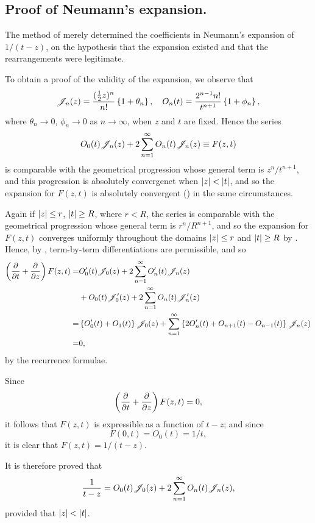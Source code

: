 \documentclass{book}
\begin{document}
\subsection{Proof of Neumann's expansion.}
The method of  merely determined the
coefficients in Neumann's expansion of $1/(t-z)$, on the hypothesis
that the expansion existed and that the rearrangements were
legitimate.

To obtain a proof of the validity of the expansion, we observe that
$$
\mathscr{J}_n(z)
=
\frac{(\frac{1}{2} z)^n}{n!} 
\left\{ 1 + \theta_n \right\},
\quad
O_n(t)
=
\frac{2^{n-1} n!}{t^{n+1}}
\left\{  1 + \phi_n \right\},
$$
%
%
where $\theta_n \rightarrow 0$, $\phi_n \rightarrow 0$ as $n
\rightarrow \infty$, when $z$ and $t$ are fixed. Hence the series
$$
O_0(t) \mathscr{J}_n(z)
+
2
\sum_{n=1}^{\infty}
O_n(t) \mathscr{J}_n(z)
\equiv
F(z,t)
$$
is comparable with the geometrical progression whose general term is
$z^n / t^{n+1}$, and this progression is absolutely convergenet when
$\left| z \right| < \left| t \right|$, and so the expansion for $F(z,t)$ is
absolutely convergent () in the same
circumstances.

Again if $\left| z \right| \leq r$, $\left| t \right| \geq R$, where $r < R$, the
series is comparable with the geometrical progression whose general
term is $r^n / R^{n+1}$, and so the expansion for $F(z,t)$ converges
uniformly throughout the domains $\left| z \right| \leq r$ and $\left| t \right|
\geq R$ by . Hence, by
, term-by-term differentiations are permissible,
and so
\begin{align*}
  \left(  \frac{\partial}{\partial t} + \frac{\partial}{\partial z}
   \right)
  F(z,t)
  =&
  O_0'(t) \mathscr{J}_0(z)
  + 2 \sum_{n=1}^{\infty} O_n'(t) \mathscr{J}_n(z)
  \\
  &
  + O_0(t) \mathscr{J}'_0(z)
  + 2 \sum_{n=1}^{\infty}
  O_n(t) \mathscr{J}'_n(z)
  \\
  =&
  \left\{  O_0'(t) + O_1(t) \right\} \mathscr{J}_0(z)
  + \sum_{n=1}^{\infty} \left\{ 
    2 O_n'(t) + O_{n+1}(t) - O_{n-1}(t)
   \right\}
  \mathscr{J}_n(z)
  \\
  =&
  0,
\end{align*}
by the recurrence formulae.

Since
$$
\left(  \frac{\partial}{\partial t} + \frac{\partial}{\partial z}
 \right)
F(z,t)
=
0,
$$
it follows that $F(z,t)$ is expressible as a function of $t-z$; and
since
$$
F(0,t) = O_0(t) = 1/t,
$$
it is clear that $F(z,t) = 1/(t-z)$.

It is therefore proved that
$$
\frac{1}{t-z}
=
O_0(t) \mathscr{J}_0(z)
+ 2 \sum_{n=1}^{\infty}
O_n(t) \mathscr{J}_n(z),
$$
provided that $\left| z \right| < \left| t \right|$.
\end{document}
